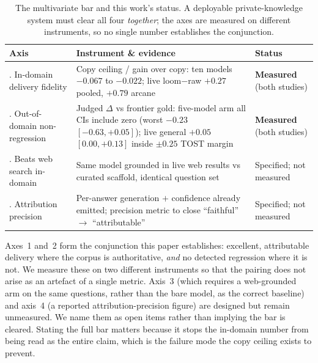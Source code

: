 \documentclass[10pt,twocolumn]{article}
\begin{document}
\begin{table}[t]\centering\small
\caption{The multivariate bar and this work's status. A deployable private-knowledge system must clear
all four \emph{together}; the axes are measured on different instruments, so no single number
establishes the conjunction.}
\label{tab:bar}
\renewcommand{\arraystretch}{1.2}
\begin{tabularx}{\textwidth}{@{}>{\raggedright\arraybackslash}p{3.5cm} >{\raggedright\arraybackslash}X >{\raggedright\arraybackslash}p{3.6cm}@{}}
\toprule
Axis & Instrument \& evidence & Status \\
\midrule
1. In-domain delivery fidelity & Copy ceiling / gain over copy: ten models $-0.067$ to $-0.022$; live loom$-$raw $+0.27$ pooled, $+0.79$ arcane & \textbf{Measured} (both studies) \\
2. Out-of-domain non-regression & Judged $\Delta$ vs frontier gold: five-model arm all CIs include zero (worst $-0.23$ $[-0.63,+0.05]$); live general $+0.05$ $[0.00,+0.13]$ inside $\pm0.25$ TOST margin & \textbf{Measured} (both studies) \\
3. Beats web search in-domain & Same model grounded in live web results vs curated scaffold, identical question set & Specified; not measured \\
4. Attribution precision & Per-answer generation $+$ confidence already emitted; precision metric to close ``faithful'' $\to$ ``attributable'' & Specified; not measured \\
\bottomrule
\end{tabularx}
\end{table}

Axes~1 and~2 form the conjunction this paper establishes: excellent, attributable delivery where the corpus is authoritative, \emph{and} no detected regression where it is not. We measure these on two different instruments so that the pairing does not arise as an artefact of a single metric. Axis~3 (which requires a web-grounded arm on the same questions, rather than the bare model, as the correct baseline) and axis~4 (a reported attribution-precision figure) are designed but remain unmeasured. We name them as open items rather than implying the bar is cleared. Stating the full bar matters because it stops the in-domain number from being read as the entire claim, which is the failure mode the copy ceiling exists to prevent.
\end{document}
